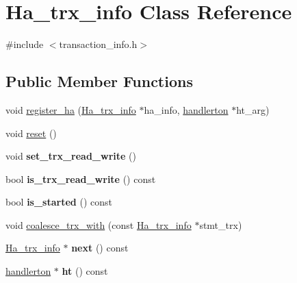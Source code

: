 \hypertarget{classHa__trx__info}{}\section{Ha\+\_\+trx\+\_\+info Class Reference}
\label{classHa__trx__info}


{\ttfamily \#include $<$transaction\+\_\+info.\+h$>$}

\subsection*{Public Member Functions}
\begin{DoxyCompactItemize}
\item 
void \mbox{\hyperlink{classHa__trx__info_a8c9605da42e7b06acb1279fbd95d342a}{register\+\_\+ha}} (\mbox{\hyperlink{classHa__trx__info}{Ha\+\_\+trx\+\_\+info}} $\ast$ha\+\_\+info, \mbox{\hyperlink{structhandlerton}{handlerton}} $\ast$ht\+\_\+arg)
\item 
void \mbox{\hyperlink{classHa__trx__info_a8566510f1fa2e76f93fa7656b110cc4b}{reset}} ()
\item 
\mbox{\label{classHa__trx__info_a9409b39e236efd90798dfcaa5d1cb969}} 
void {\bfseries set\+\_\+trx\+\_\+read\+\_\+write} ()
\item 
\mbox{\label{classHa__trx__info_a6e5c258e3bdac2c682ad0f6c9572d203}} 
bool {\bfseries is\+\_\+trx\+\_\+read\+\_\+write} () const
\item 
\mbox{\label{classHa__trx__info_a5b9dafe6b140345af7d0deee6c219134}} 
bool {\bfseries is\+\_\+started} () const
\item 
void \mbox{\hyperlink{classHa__trx__info_aa529c17a6931145e81ff19abc942a022}{coalesce\+\_\+trx\+\_\+with}} (const \mbox{\hyperlink{classHa__trx__info}{Ha\+\_\+trx\+\_\+info}} $\ast$stmt\+\_\+trx)
\item 
\mbox{\label{classHa__trx__info_a4cbb85eee36820a7921fbfe58ab38073}} 
\mbox{\hyperlink{classHa__trx__info}{Ha\+\_\+trx\+\_\+info}} $\ast$ {\bfseries next} () const
\item 
\mbox{\label{classHa__trx__info_a2fab5b974bb31c2f9a01883fed5409cf}} 
\mbox{\hyperlink{structhandlerton}{handlerton}} $\ast$ {\bfseries ht} () const
\end{DoxyCompactItemize}


